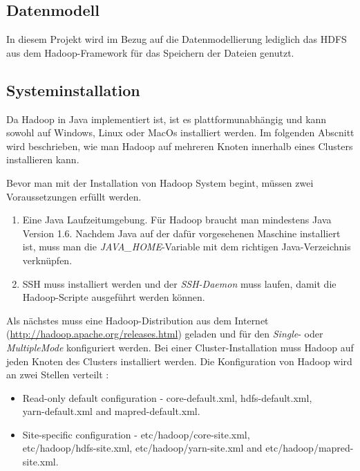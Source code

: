 
\subsection{Datenmodell}
In diesem Projekt wird im Bezug auf die Datenmodellierung lediglich das \ac{HDFS} aus dem Hadoop-Framework für das Speichern der Dateien genutzt. 


\subsection{Systeminstallation} %
Da Hadoop in Java implementiert ist, ist es plattformunabhängig und kann sowohl auf Windows, Linux oder MacOs installiert werden.
Im folgenden Abscnitt wird beschrieben, wie man Hadoop auf mehreren Knoten innerhalb eines Clusters installieren kann. 

Bevor man mit der Installation von Hadoop System begint, müssen zwei Voraussetzungen erfüllt werden.
\begin{enumerate}
\item Eine Java Laufzeitumgebung. Für Hadoop braucht man mindestens Java Version 1.6.
Nachdem Java auf der dafür vorgesehenen Maschine installiert ist, muss man die \textit{JAVA\_HOME}-Variable mit dem richtigen Java-Verzeichnis verknüpfen.
\item \ac{SSH} muss installiert werden und der \textit{\ac{SSH}-Daemon} muss laufen, damit die Hadoop-Scripte ausgeführt werden können.
\end{enumerate}
Als nächstes muss eine Hadoop-Distribution aus dem Internet (\url{http://hadoop.apache.org/releases.html}) geladen und für den \textit{Single}- oder \textit{MultipleMode} konfiguriert werden. Bei einer Cluster-Installation muss Hadoop auf jeden Knoten des Clusters installiert werden.
Die Konfiguration von Hadoop wird an zwei Stellen verteilt \cite{hadoopConfiguration}:
\begin{itemize}
\item Read-only default configuration - core-default.xml, hdfs-default.xml, \\yarn-default.xml and mapred-default.xml.
\item Site-specific configuration - etc/hadoop/core-site.xml,\\ etc/hadoop/hdfs-site.xml, etc/hadoop/yarn-site.xml and etc/hadoop/mapred-site.xml.
\end{itemize}


